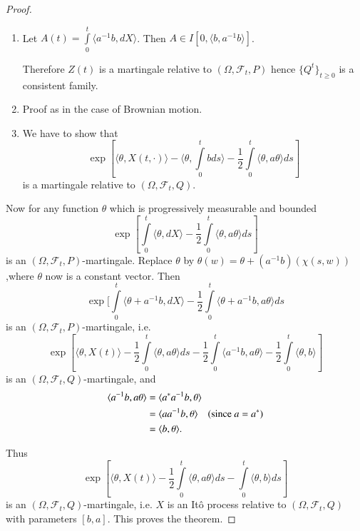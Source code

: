 \begin{proof}
\begin{enumerate}
\renewcommand{\theenumi}{\roman{enumi}}
\renewcommand{\labelenumi}{(\theenumi)}
\item Let $A(t)=\int\limits^{t}_{0}\langle a^{-1}b, dX\rangle$. Then
  $A\in I[0,\langle b, a^{-1}b\rangle]$.

Therefore $Z(t)$ is a martingale relative to
$(\Omega,\mathscr{F}_{t},P)$ hence $\{Q^{t}\}_{t\geq 0}$ is a
consistent family.

\item Proof as in the case of Brownian motion.

\item We have to show that
$$
\exp[\langle \theta,X(t,\cdot)\rangle -\langle
  \theta,\int\limits^{t}_{0}bds\rangle
  -\frac{1}{2}\int\limits^{t}_{0}\langle\theta,a\theta\rangle ds]
$$
is a martingale relative to $(\Omega,\mathscr{F}_{t},Q)$.
\end{enumerate}

Now for any function $\theta$ which is progressively measurable and
boun\-ded
$$
\exp[\int\limits^{t}_{0}\langle \theta, dX\rangle
  -\frac{1}{2}\int\limits^{t}_{0}\langle \theta, a\theta\rangle ds]
$$
is an $(\Omega,\mathscr{F}_{t},P)$-martingale. Replace $\theta$ by
$\theta(w)=\theta+(a^{-1}b)(\chi(s,w))$,\pageoriginale where $\theta$
now is a constant vector. Then
$$
\exp [\int\limits^{t}_{0}\langle \theta+a^{-1}b,dX\rangle
  -\frac{1}{2}\int\limits^{t}_{0}\langle \theta+a^{-1}b,a\theta\rangle ds
$$
is an $(\Omega, \mathscr{F}_{t},P)$-martingale, i.e.
$$
\exp[\langle \theta, X(t)\rangle
  -\frac{1}{2}\int\limits^{t}_{0}\langle \theta, a\theta\rangle
  ds-\frac{1}{2}\int\limits^{t}_{0}\langle
  a^{-1}b,a\theta\rangle-\frac{1}{2}\int\limits^{t}_{0}\langle
  \theta,b\rangle ]
$$
is an $(\Omega,\mathscr{F}_{t},Q)$-martingale, and
\begin{align*}
\langle a^{-1}b,a\theta\rangle &= \langle a^{*}a^{-1}b,\theta\rangle\\
&= \langle aa^{-1}b,\theta\rangle \quad (\text{since~ } a=a^{*})\\
&= \langle b,\theta\rangle.
\end{align*}

Thus
$$
\exp[\langle \theta, X(t)\rangle
  -\frac{1}{2}\int\limits^{t}_{0}\langle \theta,a\theta\rangle
  ds-\int\limits^{t}_{0}\langle \theta, b\rangle ds]
$$
is an $(\Omega,\mathscr{F}_{t},Q)$-martingale, i.e. $X$ is an It\^o
process relative to $(\Omega,\mathscr{F}_{t},Q)$ with parameters
$[b,a]$. This proves the theorem.
\end{proof}

